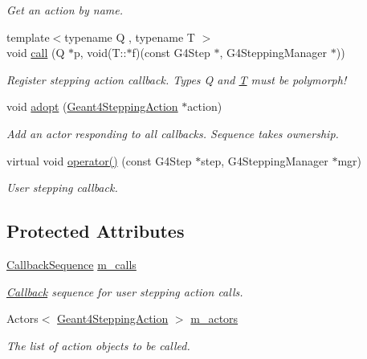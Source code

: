 \begin{DoxyCompactItemize}
\begin{DoxyCompactList}\small\item\em Get an action by name. \end{DoxyCompactList}\item 
{\footnotesize template$<$typename Q , typename T $>$ }\\void \hyperlink{class_d_d4hep_1_1_simulation_1_1_geant4_stepping_action_sequence_a7f5c29121e2d8bb99bf2a894690c70ad}{call} (Q $\ast$p, void(T\+::$\ast$f)(const G4\+Step $\ast$, G4\+Stepping\+Manager $\ast$))
\begin{DoxyCompactList}\small\item\em Register stepping action callback. Types Q and \hyperlink{class_t}{T} must be polymorph! \end{DoxyCompactList}\item 
void \hyperlink{class_d_d4hep_1_1_simulation_1_1_geant4_stepping_action_sequence_a39d7f26d436a3f512c2b467bad9d4beb}{adopt} (\hyperlink{class_d_d4hep_1_1_simulation_1_1_geant4_stepping_action}{Geant4\+Stepping\+Action} $\ast$action)
\begin{DoxyCompactList}\small\item\em Add an actor responding to all callbacks. Sequence takes ownership. \end{DoxyCompactList}\item 
virtual void \hyperlink{class_d_d4hep_1_1_simulation_1_1_geant4_stepping_action_sequence_a51e1c2c59da560ac9bc6fc0d249e06dc}{operator()} (const G4\+Step $\ast$step, G4\+Stepping\+Manager $\ast$mgr)
\begin{DoxyCompactList}\small\item\em User stepping callback. \end{DoxyCompactList}\end{DoxyCompactItemize}
\subsection*{Protected Attributes}
\begin{DoxyCompactItemize}
\item 
\hyperlink{struct_d_d4hep_1_1_callback_sequence}{Callback\+Sequence} \hyperlink{class_d_d4hep_1_1_simulation_1_1_geant4_stepping_action_sequence_a336da2773a5c1c830f1b338a32a0aa7e}{m\+\_\+calls}
\begin{DoxyCompactList}\small\item\em \hyperlink{class_d_d4hep_1_1_callback}{Callback} sequence for user stepping action calls. \end{DoxyCompactList}\item 
Actors$<$ \hyperlink{class_d_d4hep_1_1_simulation_1_1_geant4_stepping_action}{Geant4\+Stepping\+Action} $>$ \hyperlink{class_d_d4hep_1_1_simulation_1_1_geant4_stepping_action_sequence_a09eb0634934bffe70733ba62589456c2}{m\+\_\+actors}
\begin{DoxyCompactList}\small\item\em The list of action objects to be called. \end{DoxyCompactList}\end{DoxyCompactItemize}
